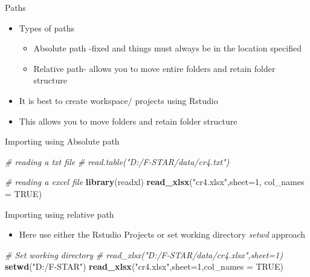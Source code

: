 \documentclass[
  ignorenonframetext,
]{beamer}
\newenvironment{Shaded}{\begin{snugshade}}{\end{snugshade}}
\newcommand{\CommentTok}[1]{\textcolor[rgb]{0.56,0.35,0.01}{\textit{#1}}}
\newcommand{\DataTypeTok}[1]{\textcolor[rgb]{0.13,0.29,0.53}{#1}}
\newcommand{\DecValTok}[1]{\textcolor[rgb]{0.00,0.00,0.81}{#1}}
\newcommand{\KeywordTok}[1]{\textcolor[rgb]{0.13,0.29,0.53}{\textbf{#1}}}
\newcommand{\NormalTok}[1]{#1}
\newcommand{\OtherTok}[1]{\textcolor[rgb]{0.56,0.35,0.01}{#1}}
\newcommand{\StringTok}[1]{\textcolor[rgb]{0.31,0.60,0.02}{#1}}
\providecommand{\tightlist}{%
  \setlength{\itemsep}{0pt}\setlength{\parskip}{0pt}}
\begin{document}
\begin{frame}{Paths}
\protect\hypertarget{paths-1}{}

\begin{itemize}
\tightlist
\item
  Types of paths

  \begin{itemize}
  \tightlist
  \item
    Absolute path -fixed and things must always be in the location
    specified
  \item
    Relative path- allows you to move entire folders and retain folder
    structure
  \end{itemize}
\item
  It is best to create workspace/ projects using Rstudio
\item
  This allows you to move folders and retain folder structure
\end{itemize}

\end{frame}

\begin{frame}[fragile]{Importing using Absolute path}
\protect\hypertarget{importing-using-absolute-path}{}

\begin{Shaded}
\begin{Highlighting}[]
\CommentTok{# reading a txt file}
\CommentTok{# read.table("D:/F-STAR/data/cr4.txt")}
\end{Highlighting}
\end{Shaded}

\begin{Shaded}
\begin{Highlighting}[]
\CommentTok{# reading a excel file}
\KeywordTok{library}\NormalTok{(readxl)}
\KeywordTok{read_xlsx}\NormalTok{(}\StringTok{"cr4.xlsx"}\NormalTok{,}\DataTypeTok{sheet=}\DecValTok{1}\NormalTok{, }\DataTypeTok{col_names =} \OtherTok{TRUE}\NormalTok{)}
\end{Highlighting}
\end{Shaded}

\end{frame}

\begin{frame}[fragile]{Importing using relative path}
\protect\hypertarget{importing-using-relative-path}{}

\begin{itemize}
\tightlist
\item
  Here use either the Rstudio Projects or set working directory
  \emph{setwd} approach
\end{itemize}

\begin{Shaded}
\begin{Highlighting}[]
\CommentTok{# Set working directory}
\CommentTok{# read_xlsx("D:/F-STAR/data/cr4.xlsx",sheet=1)}
\KeywordTok{setwd}\NormalTok{(}\StringTok{"D:/F-STAR"}\NormalTok{)}
\KeywordTok{read_xlsx}\NormalTok{(}\StringTok{"cr4.xlsx"}\NormalTok{,}\DataTypeTok{sheet=}\DecValTok{1}\NormalTok{,}\DataTypeTok{col_names =} \OtherTok{TRUE}\NormalTok{)}
\end{Highlighting}
\end{Shaded}

\end{frame}
\end{document}
